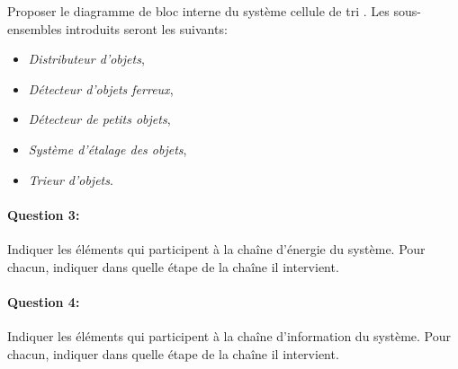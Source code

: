 Proposer le diagramme de bloc interne du système \og cellule de tri \fg. Les sous-ensembles introduits seront les suivants:
\begin{itemize}
 \item \textit{Distributeur d'objets},
 \item \textit{Détecteur d'objets ferreux},
 \item \textit{Détecteur de petits objets},
 \item \textit{Système d'étalage des objets},
 \item \textit{Trieur d'objets}.
 \end{itemize}

\paragraph{Question 3:}
Indiquer les éléments qui participent à la chaîne d'énergie du système. Pour chacun, indiquer dans quelle étape de la chaîne il intervient.

\paragraph{Question 4:}
Indiquer les éléments qui participent à la chaîne d'information du système. Pour chacun, indiquer dans quelle étape de la chaîne il intervient.




